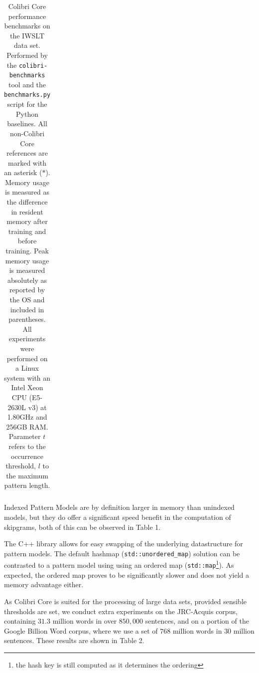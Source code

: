 \begin{table}[h]
{\begin{tabular}{lll}
\end{tabular}
\caption{Colibri Core performance benchmarks on the IWSLT data set. Performed by the \texttt{colibri-benchmarks} tool and the
\texttt{benchmarks.py} script for the Python baselines. All non-Colibri Core
references are marked with an asterisk ($\ast$). Memory usage is measured as the difference in resident memory after training
and before training. Peak memory usage is measured absolutely as reported by
the OS and included in parentheses. All experiments were performed on a Linux system
with an Intel Xeon CPU (E5-2630L v3) at 1.80GHz and 256GB RAM. Parameter $t$ refers to the occurrence threshold, $l$ to the maximum pattern length.
}
}
\label{tab:benchmarks}
\end{table}

Indexed Pattern Models are by definition larger in memory than unindexed
models, but they do offer a significant speed benefit in the computation of
skipgrams, both of this can be observed in Table 1.

The C++ library allows for easy swapping of the underlying datastructure for
pattern models. The default hashmap (\texttt{std::unordered\_map}) solution can
be contrasted to a pattern model using using an ordered map
(\texttt{std::map}\footnote{the hash key is still computed as it determines the
ordering}). As expected, the ordered map proves to be significantly slower and
does not yield a memory advantage either.

As Colibri Core is suited for the processing of large data sets, provided sensible
thresholds are set, we conduct extra experiments on the JRC-Acquis corpus,
containing $31.3$ million words in over $850,000$ sentences, and on a portion
of the Google Billion Word corpus, where we use a set of $768$ million words in
$30$ million sentences. These results are shown in Table 2.

